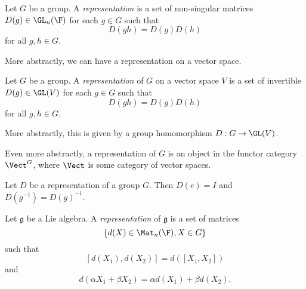 \documentclass[a4paper]{article}
\begin{document}
\begin{defi}
  Let $G$ be a group. A \emph{representation} is a set of non-singular matrices $D(g) \in \GL_n(\F)$ for each $g \in G$ such that
  \[
    D(gh) = D(g)D(h)
  \]
  for all $g, h \in G$.
\end{defi}

\begin{own}
  More abstractly, we can have a representation on a vector space.
  \begin{defi}
    Let $G$ be a group. A \emph{representation} of $G$ on a vector space $V$ is a set of invertible $D(g) \in \GL(V)$ for each $g \in G$ such that
    \[
      D(gh) = D(g)D(h)
    \]
    for all $g, h \in G$.

    More abstractly, this is given by a group homomorphism $D: G \to \GL(V)$.

    Even more abstractly, a representation of $G$ is an object in the functor category $\Vect^G$, where $\Vect$ is some category of vector spaces.
  \end{defi}
\end{own}

\begin{prop}
  Let $D$ be a representation of a group $G$. Then $D(e) = I$ and $D(g^{-1}) = D(g)^{-1}$.
\end{prop}

\begin{defi}
  Let $\mathfrak{g}$ be a Lie algebra. A \emph{representation} of $\mathfrak{g}$ is a set of matrices
  \[
    \{d(X) \in \Mat_n(\F), X \in G\}
  \]
  such that
  \[
    [d(X_1), d(X_2)] = d([X_1, X_2])
  \]
  and
  \[
    d(\alpha X_1 + \beta X_2) = \alpha d(X_1) + \beta d(X_2).
  \]
\end{defi}
\end{document}
